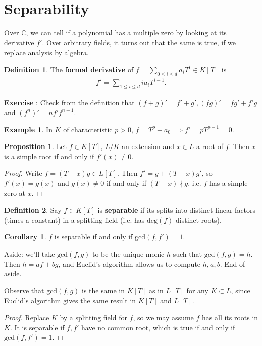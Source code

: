 \documentclass{article}
\theoremstyle{definition}
\newtheorem{cor}[theorem]{Corollary}
\newtheorem{prop}[theorem]{Proposition}
\newtheorem{example}{Example}[section]
\newtheorem{defn}{Definition}[section]
\begin{document}
\section{Separability}
Over $\mathbb{C}$, we can tell if a polynomial has a multiple zero by looking at its derivative $f'$. Over arbitrary fields, it turns out that the same is true, if we replace analysis by algebra.
\begin{defn}
    The \textbf{formal derivative} of $f = \sum_{0\le i\le d}^{} a_iT^i \in K[T]$ is
    \begin{align*}
        f' = \sum_{1\le i \le d}^{} ia_i T^{i-1}.
    \end{align*}
\end{defn}
\textbf{Exercise} : Check from the definition that $(f+g)'=f'+g',(fg)'=fg'+f'g$ and $(f^n)'=nf'f^{n-1}$.
\begin{example}
    In $K$ of characteristic $p>0$, $f=T^p+ a_0 \implies f' = pT^{p-1}=0$.
\end{example}
\begin{prop}
    Let $f \in K[T]$, $L/K$ an extension and $x \in L$ a root of $f$. Then $x$ is a simple root if and only if $f'(x) \neq 0$.
\end{prop}
\begin{proof}
    Write $f = (T-x)g \in L[T]$. Then $f' = g + (T-x)g'$, so $f'(x)=g(x)$ and $g(x)\neq0$ if and only if $(T-x) \nmid g$, i.e. $f$ has a simple zero at $x$.
\end{proof}
\begin{defn}
    Say $f \in K[T]$ is \textbf{separable} if its splits into distinct linear factors (times a constant) in a splitting field (i.e. has $\text{deg}(f)$ distinct roots).
\end{defn}
\begin{cor}
    $f$ is separable if and only if $\text{gcd}(f,f')=1$.
\end{cor}
Aside: we'll take $\text{gcd}(f,g)$ to be the unique monic $h$ such that $\text{gcd}(f,g)=h$. Then $h=af+bg$, and Euclid's algorithm allows us to compute $h,a,b$. End of aside.

Observe that $\text{gcd}(f,g)$ is the same in $K[T]$ as in $L[T]$ for any $K \subset L$, since Euclid's algorithm gives the same result in $K[T]$ and $L[T]$.

\begin{proof}
    Replace $K$ by a splitting field for $f$, so we may assume $f$ has all its roots in $K$. It is separable if $f, f'$ have no common root, which is true if and only if $\text{gcd}(f,f')=1$.
\end{proof}
\end{document}
